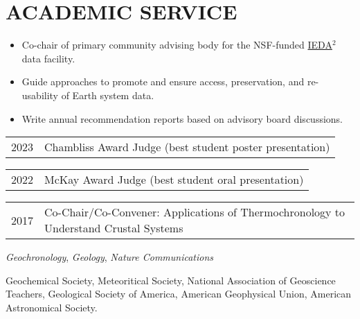 \section{ACADEMIC SERVICE}

\begin{itemize}
	\item Co-chair of primary community advising body for the NSF-funded \href{https://www.iedadata.org/}{IEDA$^2$} data facility.
	\item Guide approaches to promote and ensure access, preservation, and re-usability of Earth system data.
	\item Write annual recommendation reports based on advisory board discussions. 
\end{itemize}



\begin{tabular}{ll} 
	2023 & Chambliss Award Judge (best student poster presentation)
\end{tabular}

\begin{tabular}{ll} 
	2022 & 	McKay Award Judge (best student oral presentation)
\end{tabular}

\begin{tabular}{ll} 
	2017 & 	Co-Chair/Co-Convener: Applications of Thermochronology to Understand Crustal Systems
\end{tabular}

\textit{Geochronology}, \textit{Geology}, \textit{Nature Communications}

Geochemical Society, Meteoritical Society, National Association of Geoscience Teachers, Geological Society of America, American Geophysical Union, American Astronomical Society.